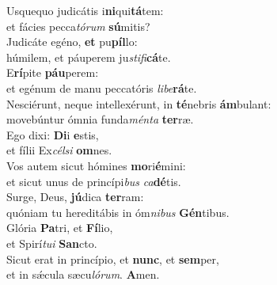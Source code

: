 \evenverse Usquequo judicátis i\textbf{ni}qui\textbf{tá}tem:~\*\\
\evenverse et fácies pecca\textit{tó}\textit{rum} \textbf{sú}mitis?\\
\oddverse Judicáte egéno, \textbf{et} pu\textbf{píl}lo:~\*\\
\oddverse húmilem, et páuperem ju\textit{sti}\textit{fi}\textbf{cá}te.\\
\evenverse E\textbf{rí}pite \textbf{páu}perem:~\*\\
\evenverse et egénum de manu peccatóris \textit{li}\textit{be}\textbf{rá}te.\\
\oddverse Nesciérunt, neque intellexérunt, in \textbf{té}nebris \textbf{ám}bulant:~\*\\
\oddverse movebúntur ómnia funda\textit{mén}\textit{ta} \textbf{ter}ræ.\\
\evenverse Ego dixi: \textbf{Di}i \textbf{e}stis,~\*\\
\evenverse et fílii Ex\textit{cél}\textit{si} \textbf{om}nes.\\
\oddverse Vos autem sicut hómines \textbf{mo}ri\textbf{é}mini:~\*\\
\oddverse et sicut unus de princípi\textit{bus} \textit{ca}\textbf{dé}tis.\\
\evenverse Surge, Deus, \textbf{jú}dica \textbf{ter}ram:~\*\\
\evenverse quóniam tu hereditábis in óm\textit{ni}\textit{bus} \textbf{Gén}tibus.\\
\oddverse Glória \textbf{Pa}tri, et \textbf{Fí}lio,~\*\\
\oddverse et Spirí\textit{tu}\textit{i} \textbf{San}cto.\\
\evenverse Sicut erat in princípio, et \textbf{nunc}, et \textbf{sem}per,~\*\\
\evenverse et in sǽcula sæcu\textit{ló}\textit{rum}. \textbf{A}men.\\
